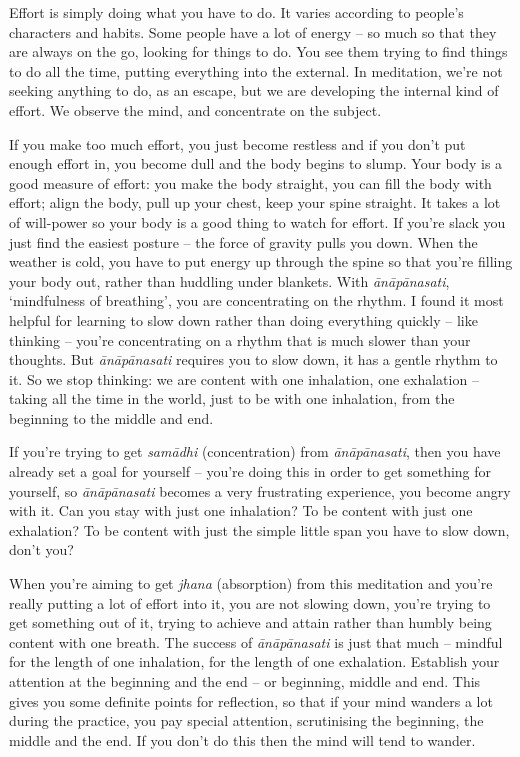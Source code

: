 
Effort is simply doing what you have to do. It varies according to people's characters and habits. Some people have a lot of energy -- so much so that they are always on the go, looking for things to do. You see them trying to find things to do all the time, putting everything into the external. In meditation, we're not seeking anything to do, as an escape, but we are developing the internal kind of effort. We observe the mind, and concentrate on the subject.

If you make too much effort, you just become restless and if you don't put enough effort in, you become dull and the body begins to slump. Your body is a good measure of effort: you make the body straight, you can fill the body with effort; align the body, pull up your chest, keep your spine straight. It takes a lot of will-power so your body is a good thing to watch for effort. If you're slack you just find the easiest posture -- the force of gravity pulls you down. When the weather is cold, you have to put energy up through the spine so that you're filling your body out, rather than huddling under blankets. With \textit{\=an\=ap\=anasati}, `mindfulness of breathing', you are concentrating on the rhythm. I found it most helpful for learning to slow down rather than doing everything quickly -- like thinking -- you're concentrating on a rhythm that is much slower than your thoughts. But \textit{\=an\=ap\=anasati} requires you to slow down, it has a gentle rhythm to it. So we stop thinking: we are content with one inhalation, one exhalation -- taking all the time in the world, just to be with one inhalation, from the beginning to the middle and end.

If you're trying to get \textit{sam\=adhi} (concentration) from \textit{\=an\=ap\=anasati}, then you have already set a goal for yourself -- you're doing this in order to get something for yourself, so \textit{\=an\=ap\=anasati} becomes a very frustrating experience, you become angry with it. Can you stay with just one inhalation? To be content with just one exhalation? To be content with just the simple little span you have to slow down, don't you?

When you're aiming to get \textit{jhana} (absorption) from this meditation and you're really putting a lot of effort into it, you are not slowing down, you're trying to get something out of it, trying to achieve and attain rather than humbly being content with one breath. The success of \textit{\=an\=ap\=anasati} is just that much -- mindful for the length of one inhalation, for the length of one exhalation. Establish your attention at the beginning and the end -- or beginning, middle and end. This gives you some definite points for reflection, so that if your mind wanders a lot during the practice, you pay special attention, scrutinising the beginning, the middle and the end. If you don't do this then the mind will tend to wander.


